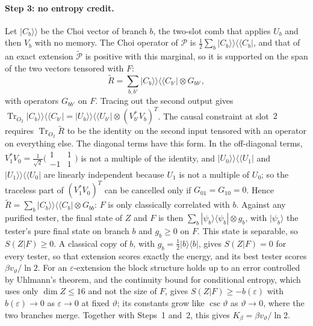\documentclass[11pt]{article}
\theoremstyle{definition}
\theoremstyle{remark}
\newcommand{\Tr}{\operatorname{Tr}}
\newcommand{\Kb}{K_\beta}
\newcommand{\Pp}{\mathcal P}
\newcommand{\Pt}{\widetilde{\mathcal P}}
\begin{document}
\paragraph{Step 3: no entropy credit.} Let $|C_b\rangle\!\rangle$ be the Choi vector of branch $b$, the two-slot comb that applies $U_b$ and then $V_b$ with no memory. The Choi operator of $\Pp$ is $\tfrac12\sum_b|C_b\rangle\!\rangle\langle\!\langle C_b|$, and that of an exact extension $\Pt$ is positive with this marginal, so it is supported on the span of the two vectors tensored with $F$:
\[
\widetilde R=\sum_{b,b'}|C_b\rangle\!\rangle\langle\!\langle C_{b'}|\otimes G_{bb'},
\]
with operators $G_{bb'}$ on $F$. Tracing out the second output gives $\Tr_{O_2}|C_b\rangle\!\rangle\langle\!\langle C_{b'}|=|U_b\rangle\!\rangle\langle\!\langle U_{b'}|\otimes(V_{b'}^*V_b)^T$. The causal constraint at slot~$2$ requires $\Tr_{O_2}\widetilde R$ to be the identity on the second input tensored with an operator on everything else. The diagonal terms have this form. In the off-diagonal terms, $V_1^*V_0=\tfrac1{\sqrt2}\bigl(\begin{smallmatrix}1&1\\-1&1\end{smallmatrix}\bigr)$ is not a multiple of the identity, and $|U_0\rangle\!\rangle\langle\!\langle U_1|$ and $|U_1\rangle\!\rangle\langle\!\langle U_0|$ are linearly independent because $U_1$ is not a multiple of $U_0$; so the traceless part of $(V_1^*V_0)^T$ can be cancelled only if $G_{01}=G_{10}=0$. Hence $\widetilde R=\sum_b|C_b\rangle\!\rangle\langle\!\langle C_b|\otimes G_{bb}$: $F$ is only classically correlated with $b$. Against any purified tester, the final state of $Z$ and $F$ is then $\sum_b|\psi_b\rangle\langle\psi_b|\otimes g_b$, with $|\psi_b\rangle$ the tester's pure final state on branch $b$ and $g_b\ge0$ on $F$. This state is separable, so $S(Z|F)\ge0$. A classical copy of $b$, with $g_b=\tfrac12|b\rangle\langle b|$, gives $S(Z|F)=0$ for every tester, so that extension scores exactly the energy, and its best tester scores $\beta v_\vartheta/\ln2$. For an $\varepsilon$-extension the block structure holds up to an error controlled by Uhlmann's theorem, and the continuity bound for conditional entropy, which uses only $\dim Z\le16$ and not the size of $F$, gives $S(Z|F)\ge-b(\varepsilon)$ with $b(\varepsilon)\to0$ as $\varepsilon\to0$ at fixed $\vartheta$; its constants grow like $\csc\vartheta$ as $\vartheta\to0$, where the two branches merge. Together with Steps~1 and~2, this gives $\Kb=\beta v_\vartheta/\ln2$.
\end{document}
